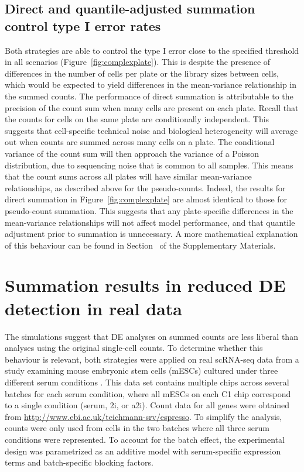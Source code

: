 \documentclass[oupdraft]{bio}
\begin{document}
\subsection{Direct and quantile-adjusted summation control type I error rates}
Both strategies are able to control the type I error close to the specified threshold in all scenarios (Figure~\ref{fig:complexplate}).
This is despite the presence of differences in the number of cells per plate or the library sizes between cells,
    which would be expected to yield differences in the mean-variance relationship in the summed counts.
The performance of direct summation is attributable to the precision of the count sum when many cells are present on each plate.
Recall that the counts for cells on the same plate are conditionally independent. 
This suggests that cell-specific technical noise and biological heterogeneity will average out when counts are summed across many cells on a plate.
The conditional variance of the count sum will then approach the variance of a Poisson distribution, due to sequencing noise \citep{marioni2008rnaseq} that is common to all samples.
This means that the count sums across all plates will have similar mean-variance relationships, as described above for the pseudo-counts.
Indeed, the results for direct summation in Figure~\ref{fig:complexplate} are almost identical to those for pseudo-count summation.
This suggests that any plate-specific differences in the mean-variance relationships will not affect model performance, and that quantile adjustment prior to summation is unnecessary.
A more mathematical explanation of this behaviour can be found in Section~\suppmeanvar{} of the Supplementary Materials.

\section{Summation results in reduced DE detection in real data}
The simulations suggest that DE analyses on summed counts are less liberal than analyses using the original single-cell counts.
To determine whether this behaviour is relevant, both strategies were applied on real scRNA-seq data from a study examining mouse embryonic stem cells (mESCs) cultured under three different serum conditions \citep{kolod2015single}.
This data set contains multiple chips across several batches for each serum condition, where all mESCs on each C1 chip correspond to a single condition (serum, 2i, or a2i). 
Count data for all genes were obtained from \url{http://www.ebi.ac.uk/teichmann-srv/espresso}.
To simplify the analysis, counts were only used from cells in the two batches where all three serum conditions were represented.
To account for the batch effect, the experimental design was parametrized as an additive model with serum-specific expression terms and batch-specific blocking factors.
\end{document}
